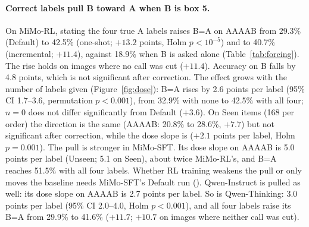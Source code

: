\paragraph{Correct labels pull B toward A when B is box 5.} On MiMo-RL, stating the four true A labels
raises B=A on AAAAB from 29.3\% (Default) to 42.5\% (one-shot; $+13.2$ points, Holm $p<10^{-5}$) and
to 40.7\% (incremental; $+11.4$), against 18.9\% when B is asked alone (Table~\ref{tab:forcing}). The
rise holds on images where no call was cut ($+11.4$). Accuracy on B falls by 4.8 points, which is not
significant after correction. The effect grows with the number of labels given
(Figure~\ref{fig:dose}): B=A rises by 2.6 points per label (95\% CI 1.7--3.6, permutation $p<0.001$),
from 32.9\% with none to 42.5\% with all four; $n=0$ does not differ significantly from Default
($+3.6$). On Seen items (168 per order) the direction is the same (AAAAB: 20.8\% to 28.6\%, $+7.7$)
but not significant after correction, while the dose slope is ($+2.1$ points per label, Holm
$p=0.001$).
The pull is stronger in MiMo-SFT. Its dose slope on AAAAB is 5.0 points per label (Unseen; 5.1 on
Seen), about twice MiMo-RL's, and B=A reaches 51.5\% with all four labels. Whether RL training weakens
the pull or only moves the baseline needs MiMo-SFT's Default run (\tbd). Qwen-Instruct is pulled as
well: its dose slope on AAAAB is 2.7 points per label. So is Qwen-Thinking: 3.0 points per label
(95\% CI 2.0--4.0, Holm $p<0.001$), and all four labels raise its B=A from 29.9\% to 41.6\%
($+11.7$; $+10.7$ on images where neither call was cut).

